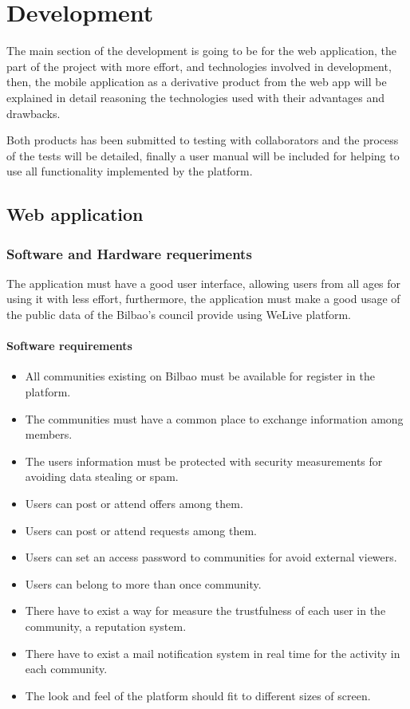 \documentclass{DeustoFDP}
\begin{document}
\chapter{Development}\label{cha:development}
The main section of the development is going to be for the web application, the part of the project with more effort, and technologies involved in development, then, the mobile application as a derivative product from the web app will be explained in detail reasoning the technologies used with their advantages and drawbacks.

Both products has been submitted to testing with collaborators and the process of the tests will be detailed, finally a user manual will be included for helping to use all functionality implemented by the platform.
\section{Web application}
\subsection{Software and Hardware requeriments}
The application must have a good user interface, allowing users from all ages for using it with less effort, furthermore, the application must make a good usage of the public data of the Bilbao's council provide using WeLive platform.

\subsubsection{Software requirements}
\begin{itemize}
	\item All communities existing on Bilbao must be available for register in the platform.
	\item The communities must have a common place to exchange information among members.
	\item The users information must be protected with security measurements for avoiding data stealing or spam.
	\item Users can post or attend offers among them.
	\item Users can post or attend requests among them.
	\item Users can set an access password to communities for avoid external viewers.
	\item Users can belong to more than once community.
	\item There have to exist a way for measure the trustfulness of each user in the community, a reputation system.
	\item There have to exist a mail notification system in real time for the activity in each community.
	\item The look and feel of the platform should fit to different sizes of screen.
\end{itemize}
\end{document}

